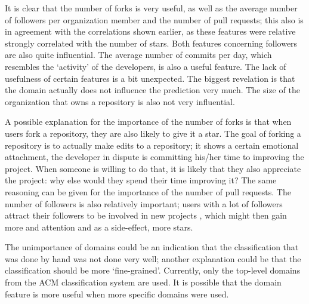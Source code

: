      It is clear that the number of forks is very useful, as well as the average number of followers per organization member and the number of pull requests; this also is in agreement with the correlations shown earlier, as these features were relative strongly correlated with the number of stars. Both features concerning followers are also quite influential. 
     The average number of commits per day, which resembles the `activity' of the developers, is also a useful feature.
     The lack of usefulness of certain features is a bit unexpected. The biggest revelation is that the domain actually does not influence the prediction very much. The size of the organization that owns a repository is also not very influential.
     
     A possible explanation for the importance of the number of forks is that when users fork a repository, they are also likely to give it a star. 
     The goal of forking a repository is to actually make edits to a repository; it shows a certain emotional attachment, the developer in dispute is committing his/her time to improving the project. 
     When someone is willing to do that, it is likely that they also appreciate the project: why else would they spend their time improving it? The same reasoning can be given for the importance of the number of pull requests.
     The number of followers is also relatively important; users with a lot of followers attract their followers to be involved in new projects \cite{blincoe-2015}, which might then gain more and attention and as a side-effect, more stars.
     
     The unimportance of domains could be an indication that the classification that was done by hand was not done very well; another explanation could be that the classification should be more `fine-grained'. 
     Currently, only the top-level domains from the ACM classification system are used. It is possible that the domain feature is more useful when more specific domains were used.
